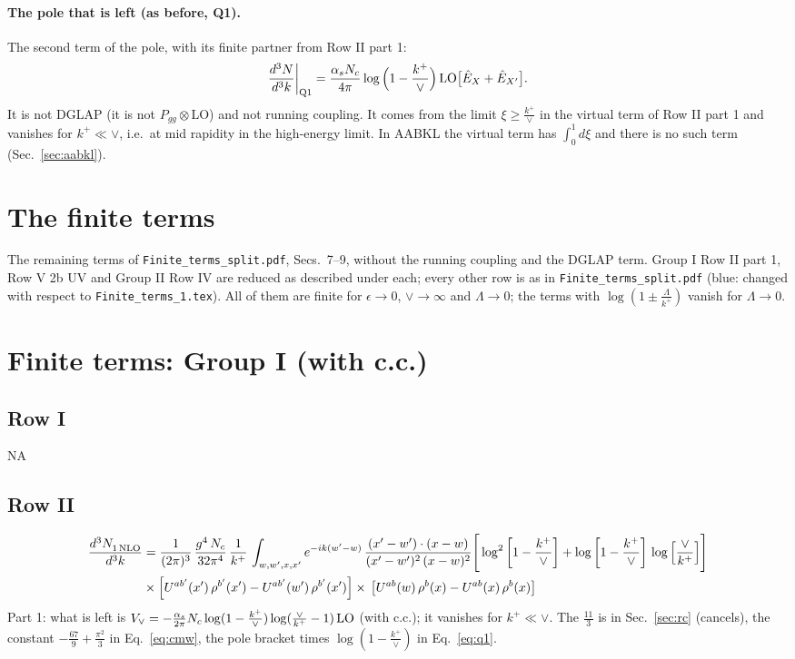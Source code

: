 \documentclass[9pt]{article}
\newcommand{\new}[1]{{\color{blue}#1}}
\numberwithin{equation}{section}
\begin{document}
\paragraph{The pole that is left (as before, Q1).} The second term of the pole, with its finite partner from Row II part 1:
\begin{equation}
\frac{d^3N}{d^3k}\bigg|_{\rm Q1}=\frac{\alpha_sN_c}{4\pi}\log\Big(1-\frac{k^+}{\vee}\Big)\,{\rm LO}\big[\hat E_X+\hat E_{X'}\big].
\label{eq:q1}
\end{equation}
It is not DGLAP (it is not $P_{gg}\otimes$LO) and not running coupling. It comes from the limit $\xi\ge\frac{k^+}{\vee}$ in the virtual term of Row II part 1 and vanishes for $k^+\ll\vee$, i.e.\ at mid rapidity in the high-energy limit. In AABKL the virtual term has $\int_0^1d\xi$ and there is no such term (Sec.~\ref{sec:aabkl}).

\section{The finite terms}\label{sec:fin}
The remaining terms of \texttt{Finite\_terms\_split.pdf}, Secs.~7--9, without the running coupling and the DGLAP term. Group I Row II part 1, Row V 2b UV and Group II Row IV are reduced as described under each; every other row is as in \texttt{Finite\_terms\_split.pdf} (blue: changed with respect to \texttt{Finite\_terms\_1.tex}). All of them are finite for $\epsilon\to0$, $\vee\to\infty$ and $\Lambda\to0$; the terms with $\log(1\pm\frac{\Lambda}{k^+})$ vanish for $\Lambda\to0$.
\section{Finite terms: Group I (with c.c.)}
\subsection{Row I}
\textsc{NA}
\subsection{Row II}
\begin{align}
\frac{d^{3}N_{1\,\rm NLO}^{\rm}}{d^{3}k} & = \frac{1}{(2\pi)^{3}}\, \frac{g^{4}\,N_{c}}{32\pi^{4}}\,\frac{1}{k^{+}}\,\int_{w, w',x,x'} e^{-ik(w^\prime-w)}\, \frac{(x'-w')\cdot (x-w)}{(x'-w')^{2}\, (x-w)^{2}}\Bigg[\log^{2}{\left[1-\frac{k^{+}}{\vee}\right]}+\log{\left[1-\frac{k^{+}}{\vee}\right]}\,\log{\left[\frac{\vee}{k^{+}}\right]}\Bigg]\notag \\ & \times\left[U^{ab'}(x')\,\rho^{b'}(x') - U^{ab'}(w')\,\rho^{b'}(x')\right]\times\,\left[U^{ab}(w)\,\rho^{b}(x) - U^{ab}(x)\,\rho^{b}(x)\right]
\end{align}
\new{Part 1: what is left is $V_\vee=-\frac{\alpha_s}{2\pi}N_c\log(1-\frac{k^+}{\vee})\log(\frac{\vee}{k^+}-1)\,{\rm LO}$ (with c.c.); it vanishes for $k^+\ll\vee$. The $\frac{11}{3}$ is in Sec.~\ref{sec:rc} (cancels), the constant $-\frac{67}{9}+\frac{\pi^2}{3}$ in Eq.~\eqref{eq:cmw}, the pole bracket times $\log(1-\frac{k^+}{\vee})$ in Eq.~\eqref{eq:q1}.}
\end{document}
